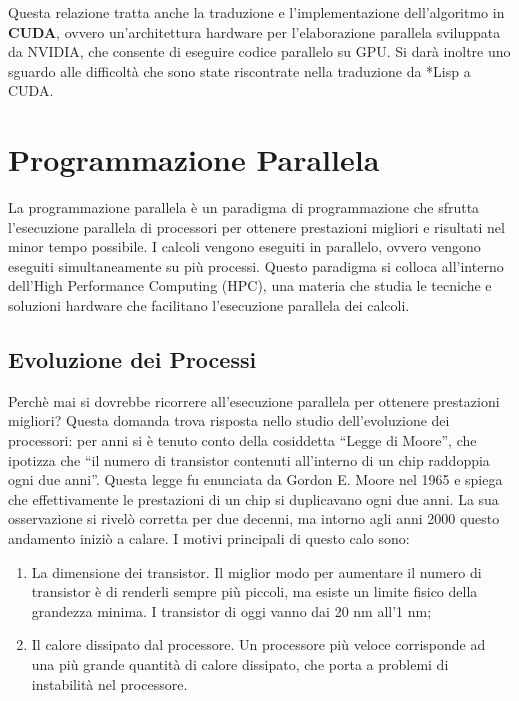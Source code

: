 \documentclass[12pt,a4paper,openright,twoside]{report}
\begin{document}
Questa relazione tratta anche la traduzione e l'implementazione dell'algoritmo in \textbf{CUDA}, ovvero un'architettura hardware per l'elaborazione parallela sviluppata da NVIDIA, che consente di eseguire codice parallelo su GPU. Si darà inoltre uno sguardo alle difficoltà che sono state riscontrate nella traduzione da *Lisp a CUDA.



\rhead[\fancyplain{}{\bfseries\leftmark}]{\fancyplain{}{\bfseries\thepage}}
\clearpage{\pagestyle{empty}\cleardoublepage}
\clearpage{\pagestyle{empty}\cleardoublepage}
\chapter{Programmazione Parallela}

\lhead[\fancyplain{}{\bfseries\thepage}]{\fancyplain{}{\bfseries\rightmark}}

La programmazione parallela è un paradigma di programmazione che sfrutta l'esecuzione parallela di processori per ottenere prestazioni migliori e risultati nel minor tempo possibile. I calcoli vengono eseguiti in parallelo, ovvero vengono eseguiti simultaneamente su più processi. Questo paradigma si colloca all'interno dell'High Performance Computing (HPC), una materia che studia le tecniche e soluzioni hardware che facilitano l'esecuzione parallela dei calcoli.



\section{Evoluzione dei Processi}

Perchè mai si dovrebbe ricorrere all'esecuzione parallela per ottenere prestazioni migliori? Questa domanda trova risposta nello studio dell'evoluzione dei processori: per anni si è tenuto conto della cosiddetta ``Legge di Moore'', che ipotizza che ``il numero di transistor contenuti all'interno di un chip raddoppia ogni due anni''. Questa legge fu enunciata da Gordon E. Moore nel 1965 e spiega che effettivamente le prestazioni di un chip si duplicavano ogni due anni. La sua osservazione si rivelò corretta per due decenni, ma intorno agli anni 2000 questo andamento iniziò a calare. I motivi principali di questo calo sono:

\begin{enumerate}
    \item La dimensione dei transistor. Il miglior modo per aumentare il numero di transistor è di renderli sempre più piccoli, ma esiste un limite fisico della grandezza minima. I transistor di oggi vanno dai 20 nm all'1 nm;
    \item Il calore dissipato dal processore. Un processore più veloce corrisponde ad una più grande quantità di calore dissipato, che porta a problemi di instabilità nel processore.
\end{enumerate}
\end{document}
